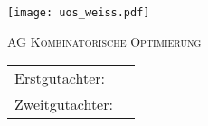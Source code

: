 \makeatletter
\begin{titlepage}
  \begin{center}
    \texttt{[image: uos\_weiss.pdf]}

    \vspace{-5mm}

    {\large \textsc{AG Kombinatorische Optimierung}} 

    \vspace{1cm}

    {\LARGE \textbf{\ThesisType{}}}

    \vspace{2.5cm}

    {\Huge\bfseries
      \@title
    }

    \vspace{3.5cm}

    {\Large \@author}

    \vspace{5mm}

    {\Large \@date}

		\vfill
		\begin{tabular}{ll}
		  \large Erstgutachter:  & \large \ThesisSupFst{}\\[3mm]
		  \large Zweitgutachter: & \large \ThesisSupSnd{}
		\end{tabular}
  \end{center}
\end{titlepage}
\makeatother
